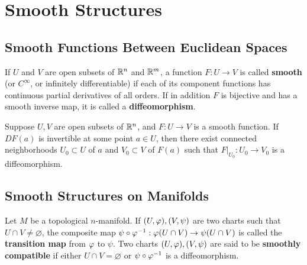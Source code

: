 \section{Smooth Structures}
\subsection{Smooth Functions Between Euclidean Spaces}
If $U$ and $V$ are open subsets of $\mathbb{R}^n$ and $\mathbb{R}^m$, a function $F:U \to V$ is called \textbf{smooth} (or $C^\infty$, or infinitely differentiable) if each of its component functions has continuous partial derivatives of all orders. If in addition $F$ is bijective and has a smooth inverse map, it is called a \textbf{diffeomorphism}.
\begin{theorem}
    Suppose $U,V$ are open subsets of $\mathbb{R}^n$, and $F:U \to V$ is a smooth function. If $DF(a)$ is invertible at some point $a \in U$, then there exist connected neighborhoods $U_0 \subset U$ of $a$ and $V_0 \subset V$ of $F(a)$ such that $F|_{U_0}: U_0 \to V_0$ is a diffeomorphism. 
\end{theorem}


\subsection{Smooth Structures on Manifolds}
Let $M$ be a topological $n$-manifold. If $(U, \varphi), (V, \psi)$ are two charts such that $U \cap V \neq \varnothing$, the composite map $\psi \circ \varphi^{-1}: \varphi(U \cap V) \to \psi(U \cap V)$ is called the \textbf{transition map} from $\varphi$ to $\psi$. 
Two charts $(U,\varphi), (V, \psi)$ are said to be \textbf{smoothly compatible} if either $U \cap V = \varnothing$ or $\psi \circ \varphi^{-1}$ is a diffeomorphism. 

